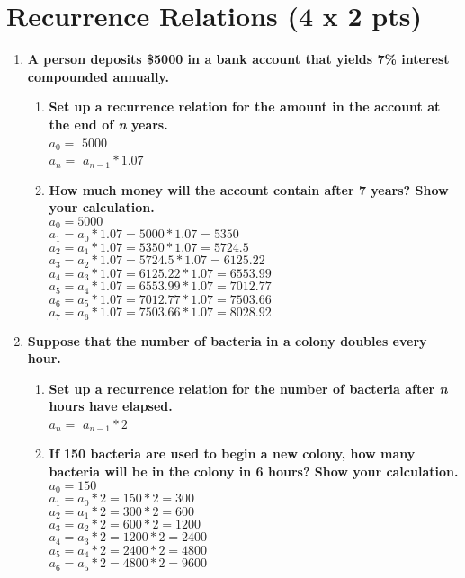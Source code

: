\documentclass[a4paper]{article}
\begin{document}
\section{Recurrence Relations (4 x 2 pts)}
\begin{enumerate}
    \item \textbf{A person deposits \$5000 in a bank account that yields 7\% interest compounded annually.}
    \begin{enumerate}
        \item \textbf{Set up a recurrence relation for the amount in the account at the end of \textit{n} years.}\\
        \boldmath $a_0 = $ \unboldmath $5000$\\
        \boldmath $a_n = $ \unboldmath $a_{n-1} * 1.07$
        \item \textbf{How much money will the account contain after 7 years? Show your calculation.}\\
        $a_0 = 5000$\\
        $a_1 = a_0 * 1.07 = 5000 * 1.07 = 5350$ \\
        $a_2 = a_1 * 1.07 = 5350 * 1.07 = 5724.5$ \\
        $a_3 = a_2 * 1.07 = 5724.5 * 1.07 = 6125.22$ \\
        $a_4 = a_3 * 1.07 = 6125.22 * 1.07 = 6553.99$ \\
        $a_5 = a_4 * 1.07 = 6553.99 * 1.07 = 7012.77$ \\
        $a_6 = a_5 * 1.07 = 7012.77 * 1.07 = 7503.66$ \\
        $a_7 = a_6 * 1.07 = 7503.66 * 1.07 = 8028.92$
    \end{enumerate}
    \item \textbf{Suppose that the number of bacteria in a colony doubles every hour.}
    \begin{enumerate}
        \item \textbf{Set up a recurrence relation for the number of bacteria after \textit{n} hours have elapsed.}\\
        \boldmath $a_n = $ \unboldmath $a_{n - 1} * 2$
        \item \textbf{If 150 bacteria are used to begin a new colony, how many bacteria will be in the colony in 6 hours? Show your calculation.}\\
        $a_0 = 150$\\
        $a_1 = a_0 * 2 = 150 * 2 = 300$\\
        $a_2 = a_1 * 2 = 300 * 2 = 600$\\
        $a_3 = a_2 * 2 = 600 * 2 = 1200$\\
        $a_4 = a_3 * 2 = 1200 * 2 = 2400$\\
        $a_5 = a_4 * 2 = 2400 * 2 = 4800$\\
        $a_6 = a_5 * 2 = 4800 * 2 = 9600$\\
    \end{enumerate}
\end{enumerate}
\end{document}
